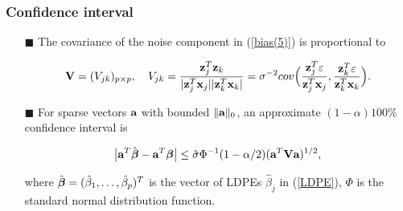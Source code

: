 \begin{frame}
\frametitle{Confidence interval}

\begin{itemize}
\item[$\blacksquare$] The covariance of the noise component in (\ref{bias(5)}) is proportional to
\begin{footnotesize}
\begin{equation}
\mbox{\bf V}=(V_{jk})_{p\times p},\quad V_{jk} = \frac{\mbox{\bf z}_j^T\mbox{\bf z}_k}{|\mbox{\bf z}_j^T\mbox{\bf x}_j||\mbox{\bf z}_k^T\mbox{\bf x}_k|}
= \sigma^{-2} cov \Big(\frac{\mbox{\bf z}_j^T\varepsilon}{\mbox{\bf z}_j^T\mbox{\bf x}_j}, \frac{\mbox{\bf z}_k^T\varepsilon}{\mbox{\bf z}_k^T\mbox{\bf x}_k}\Big).
\end{equation}
\end{footnotesize}


\item[$\blacksquare$]
For sparse vectors $\mbox{\bf a}$ with bounded $\|\mbox{\bf a}\|_0$,
an approximate $(1-\alpha)100\%$ confidence interval is
\begin{footnotesize}
\begin{equation}
\label{LDPE-CI}
\big|\mbox{\bf a} ^T \hat{\mbox{\boldmath $\beta$}} - \mbox{\bf a}^T\mbox{\boldmath $\beta$}\big| \le \hat{\sigma}\Phi^{-1}(1-\alpha/2)(\mbox{\bf a}^T\mbox{\bf V}\mbox{\bf a})^{1/2},
\end{equation}
\end{footnotesize}
where $\hat{\mbox{\boldmath $\beta$}} = (\hat{\beta}_1,\ldots,\hat{\beta}_p) ^T$ is the vector of LDPEs $\hat{\beta}_j$ in (\ref{LDPE}), $\Phi$ is the standard normal distribution function.

\end{itemize}
\end{frame}

